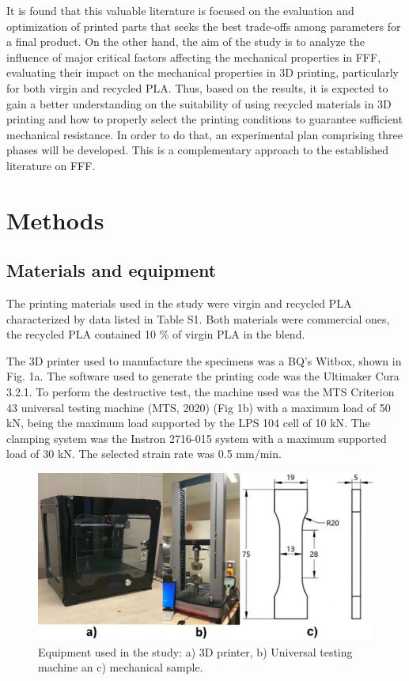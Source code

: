 \documentclass[conference,final,]{IEEEtran}
\begin{document}
It is found that this valuable literature is focused on the evaluation
and optimization of printed parts that seeks the best trade-offs among
parameters for a final product. On the other hand, the aim of the study
is to analyze the influence of major critical factors affecting the
mechanical properties in FFF, evaluating their impact on the mechanical
properties in 3D printing, particularly for both virgin and recycled
PLA. Thus, based on the results, it is expected to gain a better
understanding on the suitability of using recycled materials in 3D
printing and how to properly select the printing conditions to guarantee
sufficient mechanical resistance. In order to do that, an experimental
plan comprising three phases will be developed. This is a complementary
approach to the established literature on FFF.

\hypertarget{methods}{%
\section{Methods}\label{methods}}

\hypertarget{materials-and-equipment}{%
\subsection{Materials and equipment}\label{materials-and-equipment}}

The printing materials used in the study were virgin and recycled PLA
characterized by data listed in Table S1. Both materials were commercial
ones, the recycled PLA contained 10 \% of virgin PLA in the blend.

The 3D printer used to manufacture the specimens was a BQ's Witbox,
shown in Fig. 1a. The software used to generate the printing code was
the Ultimaker Cura 3.2.1. To perform the destructive test, the machine
used was the MTS Criterion 43 universal testing machine (MTS, 2020) (Fig
1b) with a maximum load of 50 kN, being the maximum load supported by
the LPS 104 cell of 10 kN. The clamping system was the Instron 2716-015
system with a maximum supported load of 30 kN. The selected strain rate
was 0.5 mm/min.

\begin{figure}

{\centering \includegraphics[width=0.9\linewidth]{Figures/Machine-probeta} 

}

\caption{Equipment used in the study: a) 3D printer, b) Universal testing machine an c) mechanical sample.}\label{fig:Fig.machine}
\end{figure}
\end{document}

